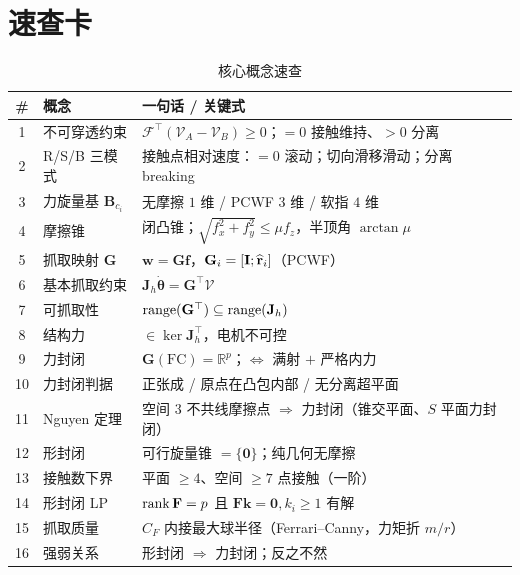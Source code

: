 \section*{速查卡}
\begin{table}[H]\centering\small
\caption{核心概念速查}
\label{tab:gc-cheatsheet}
\begin{tabular}{cll}
\toprule
\# & 概念 & 一句话 / 关键式 \\
\midrule
1 & 不可穿透约束 & $\mathcal{F}^\top(\mathcal{V}_A-\mathcal{V}_B)\ge0$；$=0$ 接触维持、$>0$ 分离 \\
2 & R/S/B 三模式 & 接触点相对速度：$=0$ 滚动；切向滑移滑动；分离 breaking \\
3 & 力旋量基 $\mathbf{B}_{c_i}$ & 无摩擦 $1$ 维 / PCWF $3$ 维 / 软指 $4$ 维 \\
4 & 摩擦锥 & 闭凸锥；$\sqrt{f_x^2+f_y^2}\le\mu f_z$，半顶角 $\arctan\mu$ \\
5 & 抓取映射 $\mathbf{G}$ & $\mathbf{w}=\mathbf{G}\mathbf{f}$，$\mathbf{G}_i=[\mathbf{I};\widehat{\mathbf{r}}_i]$（PCWF） \\
6 & 基本抓取约束 & $\mathbf{J}_h\dot{\boldsymbol{\theta}}=\mathbf{G}^\top\mathcal{V}$ \\
7 & 可抓取性 & $\operatorname{range}(\mathbf{G}^\top)\subseteq\operatorname{range}(\mathbf{J}_h)$ \\
8 & 结构力 & $\in\ker\mathbf{J}_h^\top$，电机不可控 \\
9 & 力封闭 & $\mathbf{G}(\mathrm{FC})=\mathbb{R}^p$；$\Leftrightarrow$ 满射 $+$ 严格内力 \\
10 & 力封闭判据 & 正张成 / 原点在凸包内部 / 无分离超平面 \\
11 & Nguyen 定理 & 空间 $3$ 不共线摩擦点 $\Rightarrow$ 力封闭（锥交平面、$S$ 平面力封闭） \\
12 & 形封闭 & 可行旋量锥 $=\{\mathbf{0}\}$；纯几何无摩擦 \\
13 & 接触数下界 & 平面 $\ge4$、空间 $\ge7$ 点接触（一阶） \\
14 & 形封闭 LP & $\operatorname{rank}\mathbf{F}=p$ 且 $\mathbf{F}\mathbf{k}=\mathbf{0},k_i\ge1$ 有解 \\
15 & 抓取质量 & $C_F$ 内接最大球半径（Ferrari–Canny，力矩折 $m/r$） \\
16 & 强弱关系 & 形封闭 $\Rightarrow$ 力封闭；反之不然 \\
\bottomrule
\end{tabular}
\end{table}

